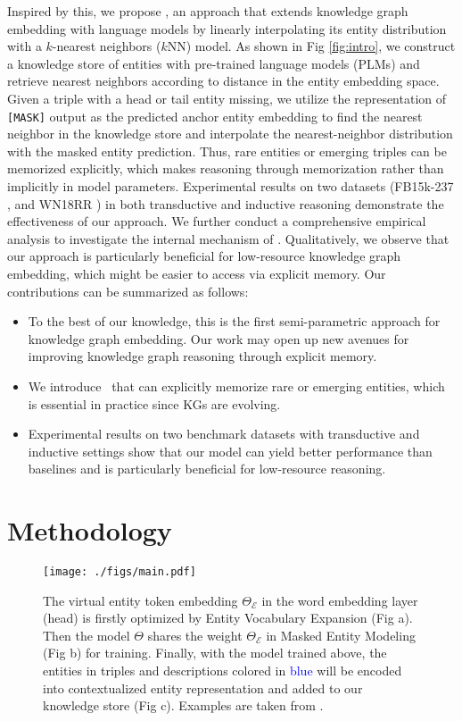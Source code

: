 \documentclass[runningheads]{llncs}
\begin{document}
Inspired by this, we propose \ours, an approach that extends knowledge graph embedding with language models by linearly interpolating its entity distribution with a $k$-nearest neighbors ($k$NN) model. 
As shown in Fig \ref{fig:intro}, we construct a knowledge store of entities with pre-trained language models (PLMs) and retrieve nearest neighbors according to distance in the entity embedding space. 
Given a triple with a head or tail entity missing, we utilize the representation of \texttt{[MASK]} output as the predicted anchor entity embedding to find the nearest neighbor in the knowledge store and interpolate the nearest-neighbor distribution with the masked entity prediction. 
Thus, rare entities or emerging triples can be memorized explicitly, which makes reasoning through memorization rather than implicitly in model parameters.
Experimental results on two datasets (FB15k-237 \cite{fb15k}, and WN18RR \cite{wn18rr}) in both transductive and inductive reasoning demonstrate the effectiveness of our approach. 
We further conduct a comprehensive empirical analysis to investigate the internal mechanism of {\ours}.
Qualitatively, we observe that our approach is particularly beneficial for low-resource knowledge graph embedding, which might be easier to access via explicit memory.
 Our contributions can be summarized as follows:
\begin{itemize}
    \item To the best of our knowledge, this is the first semi-parametric approach for knowledge graph embedding. 
    Our work may open up new avenues for improving knowledge graph reasoning through explicit memory.
    
    \item We introduce \ours~that can explicitly memorize rare or emerging entities, which is essential in practice since KGs are evolving. 
    
    \item Experimental results on two benchmark datasets with transductive and inductive settings show that our model can yield better performance than baselines and is particularly beneficial for low-resource reasoning.
\end{itemize}



\section{Methodology} 


\begin{figure*}[!htbp]
\centering 
\texttt{[image: ./figs/main.pdf]} 
\caption{
The virtual entity token embedding $\Theta_{\mathcal{E}}$ in the word embedding layer (head) is firstly optimized by Entity Vocabulary Expansion (Fig a).
Then the model $\Theta$ shares the weight $\Theta_{\mathcal{E}}$ in Masked Entity Modeling (Fig b) for training.
Finally, with the model trained above, the entities in triples and descriptions colored in \textcolor{blue}{blue} will be encoded into contextualized entity representation and added to our knowledge store (Fig c).
Examples are taken from \protect\cite{liu2021indigo}.
}
\label{fig:model}
\end{figure*}
\end{document}
